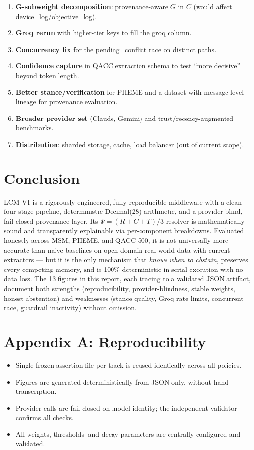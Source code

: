 \documentclass[12pt,a4paper]{article}
\begin{document}
\begin{enumerate}[leftmargin=*]
  \item \textbf{G-subweight decomposition}: provenance-aware $G$ in $C$ (would affect device\_log/objective\_log).
  \item \textbf{Groq rerun} with higher-tier keys to fill the groq column.
  \item \textbf{Concurrency fix} for the pending\_conflict race on distinct paths.
  \item \textbf{Confidence capture} in QACC extraction schema to test ``more decisive'' beyond token length.
  \item \textbf{Better stance/verification} for PHEME and a dataset with message-level lineage for provenance evaluation.
  \item \textbf{Broader provider set} (Claude, Gemini) and trust/recency-augmented benchmarks.
  \item \textbf{Distribution}: sharded storage, cache, load balancer (out of current scope).
\end{enumerate}

\section{Conclusion}

LCM V1 is a rigorously engineered, fully reproducible middleware with a clean four-stage pipeline, deterministic Decimal(28) arithmetic, and a provider-blind, fail-closed provenance layer. Its $\Psi=(R+C+T)/3$ resolver is mathematically sound and transparently explainable via per-component breakdowns. Evaluated honestly across MSM, PHEME, and QACC 500, it is not universally more accurate than naive baselines on open-domain real-world data with current extractors --- but it is the only mechanism that \emph{knows when to abstain}, preserves every competing memory, and is 100\% deterministic in serial execution with no data loss. The 13 figures in this report, each tracing to a validated JSON artifact, document both strengths (reproducibility, provider-blindness, stable weights, honest abstention) and weaknesses (stance quality, Groq rate limits, concurrent race, guardrail inactivity) without omission.

\appendix

\section{Appendix A: Reproducibility}
\begin{itemize}[leftmargin=*]
  \item Single frozen assertion file per track is reused identically across all policies.
  \item Figures are generated deterministically from JSON only, without hand transcription.
  \item Provider calls are fail-closed on model identity; the independent validator confirms all checks.
  \item All weights, thresholds, and decay parameters are centrally configured and validated.
\end{itemize}
\end{document}
